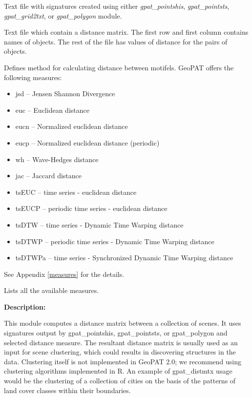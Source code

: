 
Text file with signatures created using either {\it gpat\_pointshis}, {\it gpat\_pointsts}, {\it gpat\_grid2txt}, or {\it gpat\_polygon} module.


Text file which contain a distance matrix.
The first row and first column contains names of objects. 
The rest of the file has values of distance for the pairs of objects.


Defines method for calculating distance between motifels. 
GeoPAT offers the following measures: 
\begin{itemize}
	\item jsd -- Jensen Shannon Divergence
	\item euc -- Euclidean distance
	\item eucn -- Normalized euclidean distance
	\item eucp -- Normalized euclidean distance (periodic)
	\item wh -- Wave-Hedges distance
	\item jac -- Jaccard distance
	\item tsEUC -- time series - euclidean distance
	\item tsEUCP -- periodic time series - euclidean distance
	\item tsDTW -- time series - Dynamic Time Warping distance
	\item tsDTWP -- periodic time series - Dynamic Time Warping distance
	\item tsDTWPa -- time series - Synchronized Dynamic Time Warping distance
\end{itemize}
See Appendix \ref{measures} for the details.


Lists all the available measures.


{\bf Description:}

This module computes a distance matrix between a collection of scenes. 
It uses signatures output by gpat\_pointshis, gpat\_pointsts, or gpat\_polygon and selected distance measure.
The resultant distance matrix is usually used as an input for scene clustering, which could results in discovering structures in the data.
Clustering itself is not implemented in GeoPAT 2.0; we recommend using clustering algorithms implemented in R. %
An example of gpat\_distmtx usage would be the clustering of a collection of cities on the basis of the patterns of land cover classes within their boundaries.

